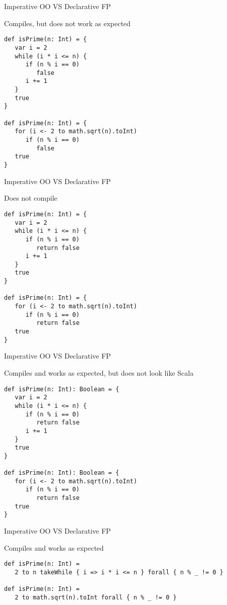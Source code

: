 \begin{frame}[fragile]{Imperative OO VS Declarative FP}
\begin{alertblock}{Compiles, but does not work as expected}
\begin{lstlisting}
def isPrime(n: Int) = {
   var i = 2
   while (i * i <= n) {
      if (n % i == 0)
         false
      i += 1
   }
   true
}

def isPrime(n: Int) = {
   for (i <- 2 to math.sqrt(n).toInt)
      if (n % i == 0)
         false
   true
}
\end{lstlisting}
\end{alertblock}
\end{frame}

\begin{frame}[fragile]{Imperative OO VS Declarative FP}
\begin{alertblock}{Does not compile}
\begin{lstlisting}
def isPrime(n: Int) = {
   var i = 2
   while (i * i <= n) {
      if (n % i == 0)
         return false
      i += 1
   }
   true
}

def isPrime(n: Int) = {
   for (i <- 2 to math.sqrt(n).toInt)
      if (n % i == 0)
         return false
   true
}
\end{lstlisting}
\end{alertblock}
\end{frame}

\begin{frame}[fragile]{Imperative OO VS Declarative FP}
\begin{block}{Compiles and works as expected, but does not look like Scala}
\begin{lstlisting}
def isPrime(n: Int): Boolean = {
   var i = 2
   while (i * i <= n) {
      if (n % i == 0)
         return false
      i += 1
   }
   true
}

def isPrime(n: Int): Boolean = {
   for (i <- 2 to math.sqrt(n).toInt)
      if (n % i == 0)
         return false
   true
}
\end{lstlisting}
\end{block}
\end{frame}

\begin{frame}[fragile]{Imperative OO VS Declarative FP}
\begin{exampleblock}{Compiles and works as expected}
\begin{lstlisting}
def isPrime(n: Int) =
   2 to n takeWhile { i => i * i <= n } forall { n % _ != 0 }

def isPrime(n: Int) =
   2 to math.sqrt(n).toInt forall { n % _ != 0 }
\end{lstlisting}
\end{exampleblock}
\end{frame}

